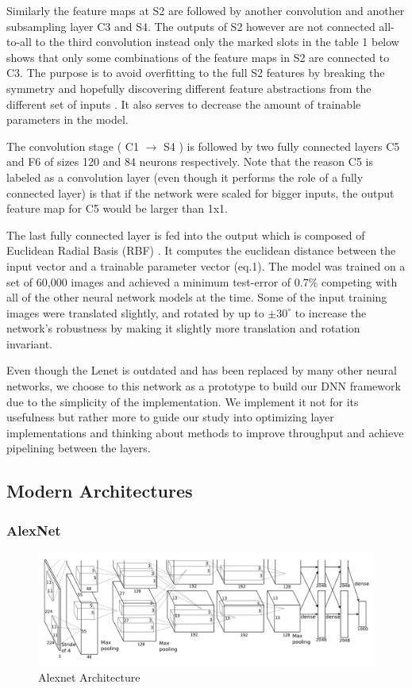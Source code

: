 Similarly the feature maps at S2 are followed by another convolution and another subsampling layer C3 and S4. The outputs of S2 however are not connected all-to-all to the third convolution instead only the marked slots in the table 1 below shows that only some combinations of the feature maps in S2 are connected to C3. The purpose is to avoid overfitting to the full S2 features by breaking the symmetry and hopefully discovering different feature abstractions from the different set of inputs \cite{lenet}. It also serves to decrease the amount of trainable parameters in the model. 

The convolution stage ( C1  $\rightarrow$ S4 ) is followed by two fully connected layers C5 and F6 of sizes 120 and 84 neurons respectively. Note that the reason C5 is labeled as a convolution layer (even though it performs the role of a fully connected layer) is that if the network were scaled for bigger inputs, the output feature map for C5 would be larger than 1x1. 

The last fully connected layer is fed into the output which is composed of Euclidean Radial Basis (RBF) \cite{chen1991orthogonal}. It computes the euclidean distance between the input vector and a trainable parameter vector (eq.1). The model was trained on a set of 60,000 images and achieved a minimum test-error of 0.7\% competing with all of the other neural network models at the time. Some of the input training images were translated slightly, and rotated by up to $\pm{30^\circ}$ to increase the network’s robustness by making it slightly more translation and rotation invariant. 

Even though the Lenet is outdated and has been replaced by many other neural networks, we choose to this network as a prototype to build our DNN framework due to the simplicity of the implementation. We implement it not for its usefulness but rather more to guide our study into optimizing layer implementations and thinking about methods to improve throughput and achieve pipelining between the layers. 

\subsection{Modern Architectures} 

\subsubsection{AlexNet}

\begin{figure}[h!]
\centering
\includegraphics[width=1.0\textwidth]{Figures/alexnet}
\caption[AlexNet]{ Alexnet Architecture  \cite{alexnet}}
\label{fig:AlexNet Architecture}
\end{figure}

